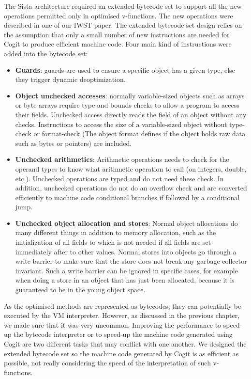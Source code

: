 \documentclass[a4paper,12pt,twoside]{../includes/ThesisStyle}
\begin{document}
The Sista architecture required an extended bytecode set to support all the new operations permitted only in optimised v-functions. The new operations were described in one of our IWST paper\cite{Bera14a}. The extended bytecode set design relies on the assumption that only a small number of new instructions are needed for Cogit to produce efficient machine code. Four main kind of instructions were added into the bytecode set:
\begin{itemize}
\item \textbf{Guards}: guards are used to ensure a specific object has a given type, else they trigger dynamic deoptimization.
\item \textbf{Object unchecked accesses}: normally variable-sized objects such as arrays or byte arrays require type and bounds checks to allow a program to access their fields. Unchecked access directly reads the field of an object without any checks. Instructions to access the size of a variable-sized object without type-check or format-check (The object format defines if the object holds raw data such as bytes or pointers) are included.
\item \textbf{Unchecked arithmetics}: Arithmetic operations needs to check for the operand types to know what arithmetic operation to call (on integers, double, etc.). Unchecked operations are typed and do not need these check. In addition, unchecked operations do not do an overflow check and are converted efficiently to machine code conditional branches if followed by a conditional jump.
\item \textbf{Unchecked object allocation and stores}: Normal object allocations do many different things in addition to memory allocation, such as the initialization of all fields to  which is not needed if all fields are set immediately after to other values. Normal stores into objects go through a write barrier to make sure that the store does not break any garbage collector invariant. Such a write barrier can be ignored in specific cases, for example when doing a store in an object that has just been allocated, because it is guaranteed to be in the young object space.
\end{itemize}

As the optimised methods are represented as bytecodes, they can potentially be executed by the VM interpreter. However, as discussed in the previous chapter, we made sure that it was very uncommon. Improving the performance to speed-up the bytecode interpreter or to speed-up the machine code generated using Cogit are two different tasks that may conflict with one another. We designed the extended bytecode set so the machine code generated by Cogit is as efficient as possible, not really considering the speed of the interpretation of such v-functions.
\end{document}
